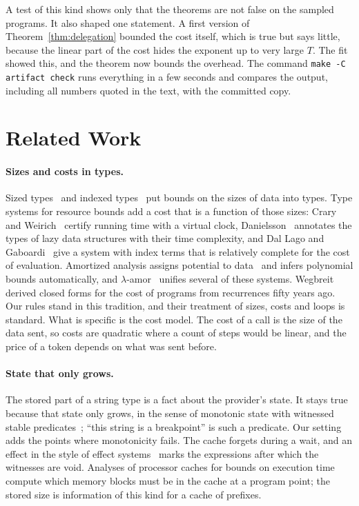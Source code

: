 \documentclass[acmsmall,nonacm,screen]{acmart}
\begin{document}
A test of this kind shows only that the theorems are not false on the sampled programs. It
also shaped one statement. A first version of Theorem~\ref{thm:delegation} bounded the cost
itself, which is true but says little, because the linear part of the cost hides the exponent
up to very large $T$. The fit showed this, and the theorem now bounds the overhead. The command
\texttt{make -C artifact check} runs everything in a few seconds and compares the output,
including all numbers quoted in the text, with the committed copy.

\section{Related Work}
\label{sec:related}

\paragraph{Sizes and costs in types.} Sized types~\cite{hughes1996} and indexed
types~\cite{xi1999} put bounds on the sizes of data into types. Type systems for resource
bounds add a cost that is a function of those sizes: Crary and Weirich~\cite{crary2000}
certify running time with a virtual clock, Danielsson~\cite{danielsson2008} annotates the
types of lazy data structures with their time complexity, and Dal Lago and
Gaboardi~\cite{dallago2011} give a system with index terms that is relatively complete for
the cost of evaluation. Amortized analysis assigns potential to
data~\cite{hofmann2003,hoffmann2011} and infers polynomial bounds automatically, and
$\lambda$-amor~\cite{rajani2021} unifies several of these systems. Wegbreit~\cite{wegbreit1975}
derived closed forms for the cost of programs from recurrences fifty years ago. Our rules
stand in this tradition, and their treatment of sizes, costs and loops is standard. What is
specific is the cost model. The cost of a call is the size of the data sent, so costs are
quadratic where a count of steps would be linear, and the price of a token depends on what
was sent before.

\paragraph{State that only grows.} The stored part of a string type is a fact about the
provider's state. It stays true because that state only grows, in the sense of monotonic
state with witnessed stable predicates~\cite{ahman2018}; ``this string is a breakpoint'' is
such a predicate. Our setting adds the points where monotonicity fails. The cache forgets
during a wait, and an effect in the style of effect systems~\cite{lucassen1988} marks the
expressions after which the witnesses are void. Analyses of processor caches for bounds on
execution time~\cite{ferdinand1999} compute which memory blocks must be in the cache at a
program point; the stored size is information of this kind for a cache of prefixes.
\end{document}
